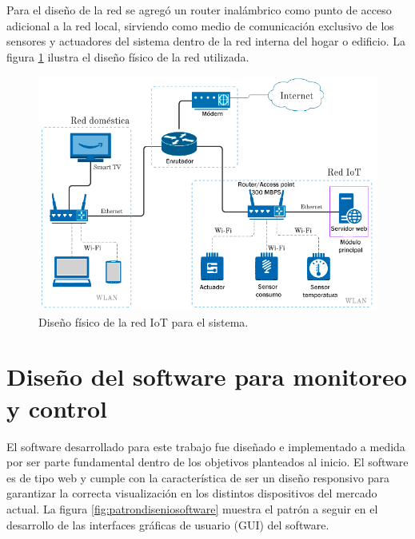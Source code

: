 Para el diseño de la red se agregó un router inalámbrico como punto de acceso adicional a la red local, sirviendo como medio de comunicación exclusivo de los sensores y actuadores del sistema dentro de la red interna del hogar o edificio. La figura \ref{fig:diagramared} ilustra el diseño físico de la red utilizada.
\begin{figure}[htpb]
\centering 
\includegraphics[width=1.0\textwidth]{./Figures/rediot3.png}
\caption{Diseño físico de la red IoT para el sistema.}
\label{fig:diagramared}
\end{figure}
\section{Diseño del software para monitoreo y control}

El software desarrollado para este trabajo fue diseñado e implementado a medida por ser parte fundamental dentro de los objetivos planteados al inicio. El software es de tipo web y cumple con la característica de ser un diseño responsivo para garantizar la correcta visualización en los distintos dispositivos del mercado actual. La figura \ref{fig:patrondiseniosoftware} muestra el patrón a seguir en el desarrollo de las interfaces gráficas de usuario (GUI) del software.

